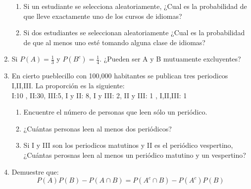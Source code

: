 \documentclass[12pt,a4paper]{report}
\begin{document}
\begin{enumerate}
{\begin{enumerate}[label=\alph*) ]
{   }

   \item {
   Si un estudiante se selecciona aleatoriamente, ¿Cual es la probabilidad de que lleve exactamente uno de los cursos de idiomas?\\

   }
   
   \item {
  Si dos estudiantes se seleccionan aleatoriamente ¿Cual es la probabilidad de que al menos uno esté tomando alguna clase de idiomas?\\

   }
   
   
	\end{enumerate}

	}

   \item {
  	Si $P(A) = \frac{1}{3}$ y $P(B^c)=\frac{1}{4}$. ¿Pueden ser A y B mutuamente excluyentes? 
	}

   \item {
    En cierto pueblecillo con 100,000 habitantes se publican tres periodicos I,II,III. La proporción es la siguiente:\\
I:10 , II:30, III:5, I y II: 8, I y III: 2, II y III: 1 , I,II,III: 1
	\begin{enumerate}[label=\alph*) ]
   \item {
   Encuentre el número de personas que leen sólo un periódico.\\

   }

   \item {
   ¿Cuántas personas leen al menos dos periódicos?\\

   }
   
   \item {
  Si I y III son los periodicos matutinos y II es el periódico vespertino, ¿Cuántas perosnas leen al menos un periódico matutino y un vespertino?\\

   }

	\end{enumerate}

    }

   \item {
    Demuestre que:\\
	$$P(A)P(B)-P(A \cap B)=P(A^c \cap B )- P(A^c)P(B)$$
	}
	

\end{enumerate}
\end{document}
